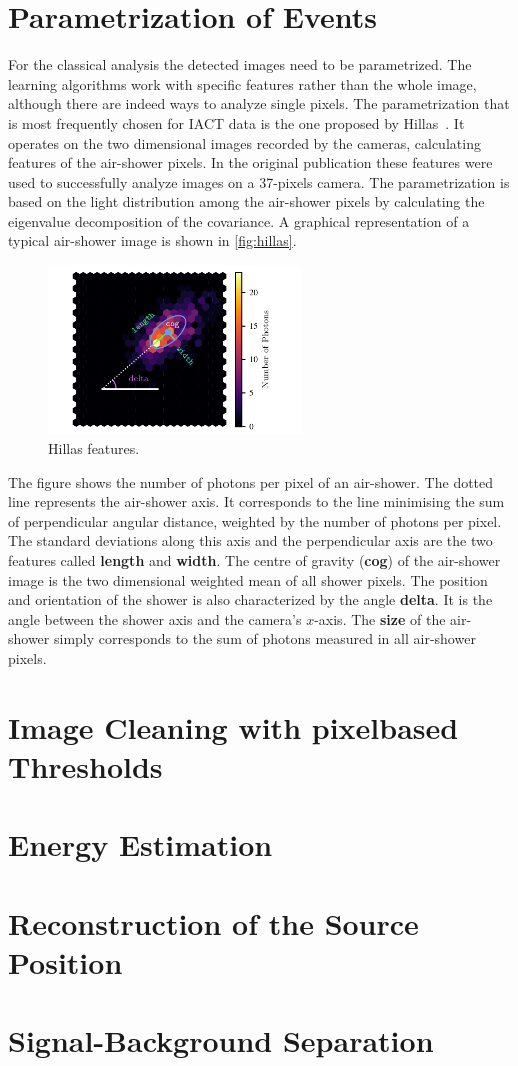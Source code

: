 \section{Parametrization of Events}
%
For the classical analysis the detected images need to be parametrized. The
learning algorithms work with specific features rather than the whole image,
although there are indeed ways to analyze single pixels. The parametrization
that is most frequently chosen for IACT data is the one proposed by
Hillas~\cite{Hillas}. It operates on the two dimensional images recorded by the
cameras, calculating features of the air-shower pixels. In the original
publication these features were used to successfully analyze images on a
37-pixels camera. The parametrization is based on the light distribution among
the air-shower pixels by calculating the eigenvalue decomposition of the
covariance. A graphical representation of a typical air-shower image is shown
in \autoref{fig:hillas}.
%
\begin{figure}
  \centering%
  \includegraphics[width=0.6\textwidth]{Plots/hillas.pdf}%
  \caption{Hillas features.}%
  \label{fig:hillas}%
\end{figure}
%
The figure shows the number of photons per pixel of an air-shower. The dotted
line represents the air-shower axis. It corresponds to the line minimising the
sum of perpendicular angular distance, weighted by the number of photons per
pixel. The standard deviations along this axis and the perpendicular axis are
the two features called \textbf{length} and \textbf{width}. The centre of
gravity (\textbf{cog}) of the air-shower image is the two dimensional weighted
mean of all shower pixels. The position and orientation of the shower is also
characterized by the angle \textbf{delta}. It is the angle between the shower
axis and the camera's $x$-axis. The \textbf{size} of the air-shower simply
corresponds to the sum of photons measured in all air-shower pixels.




\section{Image Cleaning with pixelbased Thresholds}
%
\section{Energy Estimation}
%
\section{Reconstruction of the Source Position}
%
\section{Signal-Background Separation}
